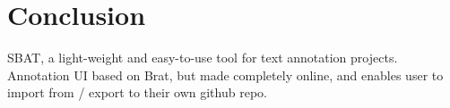 \documentclass[a4paper]{article}
\begin{document}
\section{Conclusion}
SBAT, a light-weight and easy-to-use tool for text annotation projects.\\ 
Annotation UI based on Brat, but made completely online, and enables user to import from / export to their own github repo.









%
%
\end{document}
